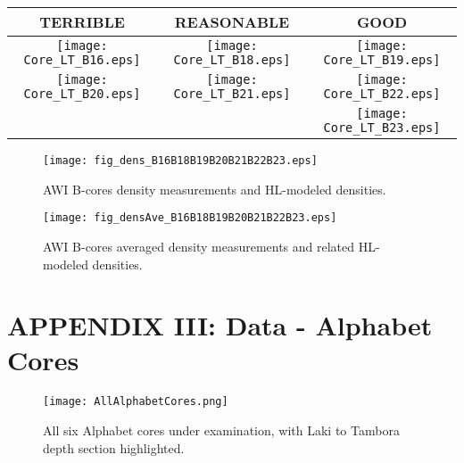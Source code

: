 \documentclass[../../CompleteThesis2/Complete_2ndDraft.tex]{subfiles}
\begin{document}
	
	\newpage
	\begin{rotatepage}
		\begin{landscape}
			\begin{table}
				\centering
				\begin{tabular}{c||c||c}
					\textcolor{BrickRed}{\textbf{TERRIBLE}} & \textcolor{YellowOrange}{\textbf{REASONABLE}} & \textcolor{OliveGreen}{\textbf{GOOD}} \\
					\hline
					\texttt{[image: Core\_LT\_B16.eps]} & \texttt{[image: Core\_LT\_B18.eps]} & \texttt{[image: Core\_LT\_B19.eps]} \\
					\texttt{[image: Core\_LT\_B20.eps]} & \texttt{[image: Core\_LT\_B21.eps]} & \texttt{[image: Core\_LT\_B22.eps]} \\	
					& & \texttt{[image: Core\_LT\_B23.eps]} \\
				\end{tabular}
			\end{table}
		\end{landscape}
	\end{rotatepage}
	\newpage
	
	\begin{rotatepage}
		\begin{landscape}
			\begin{figure}[h]
				\centering
				\texttt{[image: fig\_dens\_B16B18B19B20B21B22B23.eps]}
				\label{fig:dens}
				\caption[AWI B-cores density, theory and data.]\small{AWI B-cores density measurements and HL-modeled densities.}
			\end{figure}
		\end{landscape}
	\end{rotatepage}
	\newpage
	\begin{rotatepage}
		\begin{landscape}
			\begin{figure}[h]
				\centering
				\texttt{[image: fig\_densAve\_B16B18B19B20B21B22B23.eps]}
				\label{fig:densAve}
				\caption[AWI B-cores, theory and averaged data.]{\small AWI B-cores averaged density measurements and related HL-modeled densities.}
			\end{figure}
		\end{landscape}
	\end{rotatepage}
	
	
	
	\newpage
	\section[Appendix III: Alphabet Cores]{APPENDIX III: Data - Alphabet Cores}
	\label{AppIII:Data_Alphabet}
	\begin{figure}[h]
		\centering
		\texttt{[image: AllAlphabetCores.png]}
		\caption[Alphabet cores, in full.]{\small All six Alphabet cores under examination, with Laki to Tambora depth section highlighted.}
		\label{fig:AllAlphabetCores}
	\end{figure}
	
\end{document}

